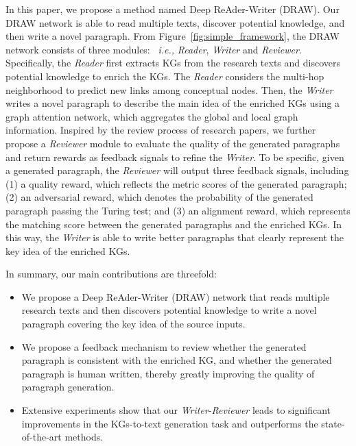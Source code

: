 \documentclass[letterpaper]{article}
\def\hmg{\textcolor{black}}
\def\dcr{\textcolor{black}}
\def\ie{\emph{i.e., }}
\begin{document}
In this paper, we propose a method named 
Deep ReAder-Writer (DRAW). Our DRAW network is able to read multiple texts, discover potential knowledge, and then write a novel paragraph. 
From Figure~\ref{fig:simple_framework}, the DRAW network consists of three modules: ~\ie \textit{Reader}, \textit{Writer} and \textit{Reviewer}.
Specifically, the \textit{Reader} first extracts KGs from the research texts and discovers potential knowledge to enrich the KGs.
The \textit{Reader} considers the multi-hop neighborhood to predict new links among conceptual nodes. 
Then, the \textit{Writer} writes a novel paragraph to describe the main idea of the enriched KGs using a graph attention network, which aggregates the global and local graph information.
Inspired by the review process of research papers, we further propose a \textit{Reviewer} \dcr{module} to evaluate the quality of the generated paragraphs and return rewards as feedback signals to refine the \textit{Writer}. To be specific, given a generated paragraph, the \textit{Reviewer} will output three feedback signals, including (1) \hmg{a} quality reward, which reflects the metric scores of the generated paragraph; (2) \hmg{an} adversarial reward, which denotes the probability of the generated paragraph passing the Turing test; and (3) \hmg{an} alignment reward, which represents the matching score between the generated paragraphs and the enriched KGs.
In this way, the \textit{Writer} {is able} to write better paragraphs {that} clearly represent the key idea of the enriched KGs.


In summary, our main contributions are threefold:

\begin{itemize}
    \item We propose a Deep ReAder-Writer (DRAW) network  that reads multiple
    research texts
    and then discovers potential knowledge to write a novel paragraph covering the key idea of the source inputs.
    
    
    \item 
We propose a feedback mechanism to review whether the generated paragraph is consistent with the enriched KG, and whether the generated 
    paragraph is human written, thereby greatly improving the quality of paragraph generation.
    
    \item Extensive experiments show that our \textit{Writer}-\textit{Reviewer} leads to significant improvements in \hmg{the} KGs-to-text generation task and outperforms the state-of-the-art methods.

\end{itemize}
\end{document}
